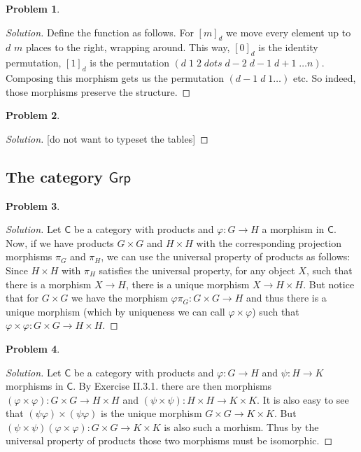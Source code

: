 \documentclass{article}
\theoremstyle{definition}
\newtheorem{problem-internal}{Problem}[subsection]
\newenvironment{problem}{
	\medskip
	\begin{problem-internal}
	}{
\end{problem-internal}
}
\newenvironment{solution}{
	\begin{proof}[Solution]
		\vspace{-8px}
		\setlength{\parskip}{4px}
		\setlength{\parindent}{0px}
	}{
\end{proof}
}
\newcommand{\C}{\mathsf{C}}
\begin{document}
\begin{problem}
\end{problem}

\begin{solution}
	Define the function as follows. For $[m]_d$ we move every element up to $d$ $m$ places to the right, wrapping around. This way, $[0]_d$ is the identity permutation, $[1]_d$ is the permutation $(d\;1\;2\;dots\;d-2\;d-1\;d+1\;\dots n)$. Composing this morphism gets us the permutation $(d-1\;d\;1\dots)$ etc. So indeed, those morphisms preserve the structure.
\end{solution}

\begin{problem}
\end{problem}

\begin{solution}
	[do not want to typeset the tables]
\end{solution}

\subsection{The category $\mathsf{Grp}$}

\begin{problem}
\end{problem}

\begin{solution}
	Let $\C$ be a category with products and $\varphi: G \to H$ a morphism in $\C$. Now, if we have products $G \times G$ and $H \times H$ with the corresponding projection morphisms $\pi_G$ and $\pi_H$, we can use the universal property of products as follows: Since $H \times H$ with $\pi_H$ satisfies the universal property, for any object $X$, such that there is a morphism $X \to H$, there is a unique morphism $X \to H \times H$. But notice that for $G \times G$ we have the morphism $\varphi \pi_G: G \times G \to H$ and thus there is a unique morphism (which by uniqueness we can call $\varphi \times \varphi$) such that $\varphi \times \varphi: G \times G \to H \times H$.
\end{solution}

\begin{problem}
\end{problem}

\begin{solution}
	Let $\C$ be a category with products and $\varphi: G \to H$ and $\psi: H \to K$ morphisms in $\C$. By Exercise II.3.1. there are then morphisms $(\varphi \times \varphi): G \times G \to H \times H$ and $(\psi \times \psi): H \times H \to K \times K$. It is also easy to see that $(\psi\varphi) \times (\psi\varphi)$ is the unique morphism $G \times G \to K \times K$. But $(\psi \times \psi)(\varphi \times \varphi): G \times G \to K \times K$ is also such a morhism. Thus by the universal property of products those two morphisms must be isomorphic.
\end{solution}
\end{document}
